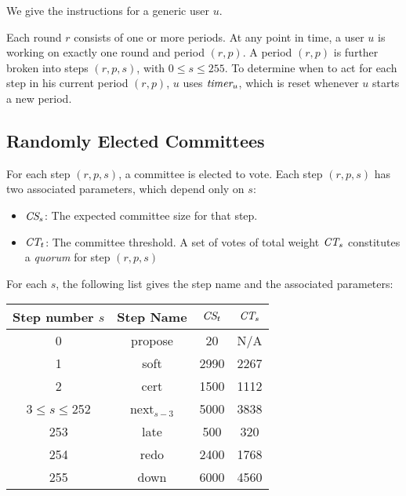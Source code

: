 \documentclass[../main.tex]{subfiles}
\begin{document}
We give the instructions for a generic user $u$.

Each round $r$ consists of one or more periods. 
At any point in time, a user $u$ is working on exactly one round and period $(r,p)$.  
A period $(r,p)$ is further broken into steps $(r,p,s)$, with $0\leq s \leq 255$. 
To determine when to act for each step in his current period $(r,p)$, $u$ uses $\textit{timer}_u$, 
which is reset whenever $u$ starts a new period.

\subsection{Randomly Elected Committees}

For each step $(r,p,s)$, a committee is elected to vote. Each step $(r,p,s)$ has two associated parameters, which depend only on $s$:
\begin{itemize}
    \item $\textit{\textit{CS}}_s$: The expected committee size for that step.
    \item $\textit{\textit{CT}}_t$: The committee threshold. A set of votes of total weight $\textit{\textit{CT}}_s$ constitutes a \textit{quorum} for step $(r,p,s)$
\end{itemize}
For each $s$, the following list gives the step name and the associated parameters:

\begin{center}
\begin{tabular}{ |c|c|c|c| } 
 \hline
 Step number $s$ & Step Name & $\textit{CS}_t$ & $\textit{CT}_s$ \\
 \hline
 0 & propose & 20 & N/A \\ 
 1 & soft & 2990 & 2267 \\ 
 2 & cert & 1500 & 1112 \\ 
 3$\leq s \leq$252 & next$_{s-3}$ & 5000 & 3838 \\ 
 253 & late & 500 & 320 \\ 
 254 & redo & 2400 & 1768 \\ 
 255 & down & 6000 & 4560 \\ 
 \hline
\end{tabular}
\end{center}
\end{document}
